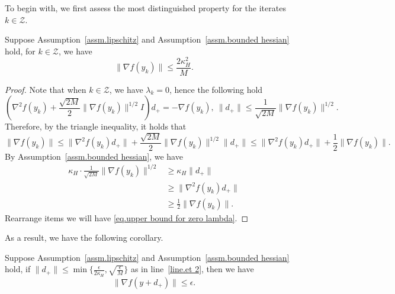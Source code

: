 \documentclass{mcom-l}
\numberwithin{equation}{section}
\begin{document}
To begin with, we first assess the most distinguished property for the iterates $k\in\mathcal{Z}$.
\begin{lemma}
    \label{lem.upper bound for zero lambda}
    Suppose Assumption~\ref{assm.lipschitz} and Assumption~\ref{assm.bounded hessian} hold, for $k\in \mathcal{Z}$, we have
    \begin{equation}
        \label{eq.upper bound for zero lambda}
        \|\nabla f(y_k)\|\leq \frac{2\kappa_H^2}{M}.
    \end{equation}
\end{lemma}
\begin{proof}
    Note that when $k\in \mathcal{Z}$, we have $\lambda_k =0$, hence the following hold
    \begin{equation*}
        \left (\nabla^2 f(y_k)+\frac{\sqrt{2M}}{2}\|\nabla f(y_k)\|^{1/2} I\right )d_+ = -\nabla f(y_k), \ \|d_+\| \leq \frac{1}{\sqrt{2M}}\|\nabla f(y_k)\|^{1/2}.
    \end{equation*}
    Therefore, by the triangle inequality, it holds that
    \begin{equation*}
        \|\nabla f(y_k)\| \leq \|\nabla^2 f(y_k) d_+\| +\frac{\sqrt{2M}}{2}\|\nabla f(y_k)\|^{1/2}\|d_+\| \leq \|\nabla^2 f(y_k) d_+\|+\frac{1}{2}\|\nabla f(y_k)\|.
    \end{equation*}
    By Assumption~\ref{assm.bounded hessian}, we have
    \begin{equation*}
        \begin{aligned}
            \kappa_H \cdot \frac{1}{\sqrt{2M}}\|\nabla f(y_k)\|^{1/2} & \geq \kappa_H \|d_+\|              \\
                                                                      & \geq \|\nabla^2 f(y_k) d_+\|       \\
                                                                      & \geq \frac{1}{2}\|\nabla f(y_k)\|.
        \end{aligned}
    \end{equation*}
    Rearrange items we will have \eqref{eq.upper bound for zero lambda}.
\end{proof}
As a result, we have the following corollary.
\begin{corollary}
    \label{coro.second et}
    Suppose Assumption~\ref{assm.lipschitz} and Assumption~\ref{assm.bounded hessian} hold, if $\|d_+\|\leq \min\{\frac{\epsilon}{2\kappa_H},\sqrt{\frac{\epsilon}{M}}\}$ as in line~\ref{line.et 2}, then we have
    \begin{equation*}
        \|\nabla f(y+d_+)\|\leq \epsilon.
    \end{equation*}
\end{corollary}
\end{document}
